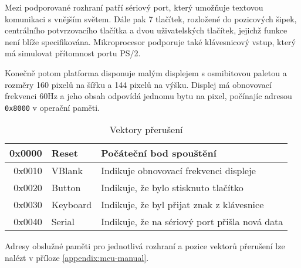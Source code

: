 Mezi podporované rozhraní patří sériový port, který umožňuje textovou komunikaci s vnějším světem. Dále pak 7 tlačítek, rozložené do pozicových šipek, centrálního potvrzovacího tlačítka a dvou uživatelských tlačítek, jejichž funkce není blíže specifikována. Mikroprocesor podporuje také klávesnicový vstup, který má simulovat přítomnost portu PS/2.

Konečně potom platforma disponuje malým displejem s osmibitovou paletou a rozměry 160 pixelů na šířku a 144 pixelů na výšku. Displej má obnovovací frekvenci 60Hz a jeho obsah odpovídá jednomu bytu na pixel, počínajíc adresou \texttt{0x8000} v operační paměti.

\begin{table}
\begin{center}
\begin{tabular}{| r | l | l |}
\hline
0x0000 & Reset    & Počáteční bod spouštění \\ \hline
0x0010 & VBlank	  & Indikuje obnovovací frekvenci displeje \\ \hline
0x0020 & Button   & Indikuje, že bylo stisknuto tlačítko \\ \hline
0x0030 & Keyboard & Indikuje, že byl přijat znak z klávesnice \\ \hline
0x0040 & Serial   & Indikuje, že na sériový port přišla nová data \\
\hline
\end{tabular}
\end{center}
\caption{Vektory přerušení }
\label{tbl:vector-positions}
\end{table}

Adresy obslužné paměti pro jednotlivá rozhraní a pozice vektorů přerušení lze nalézt v příloze \ref{appendix:mcu-manual}.
